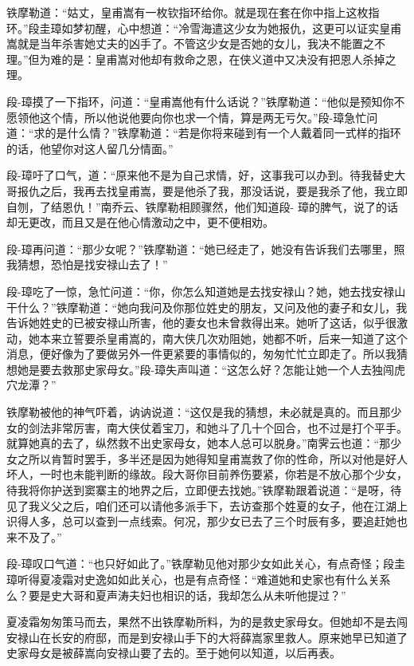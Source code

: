 \documentclass[12pt,oneside]{book}
\begin{document}
铁摩勒道：``姑丈，皇甫嵩有一枚钦指环给你。就是现在套在你中指上这枚指环。''段圭璋如梦初醒，心中想道：``冷雪海遣这少女为她报仇，这更可以证实皇甫嵩就是当年杀害她丈夫的凶手了。不管这少女是否她的女儿，我决不能置之不理。''但为难的是：皇甫嵩对他却有救命之恩，在侠义道中又决没有把恩人杀掉之理。

段-璋摸了一下指环，问道：``皇甫嵩他有什么话说？''铁摩勒道：``他似是预知你不愿领他这个情，所以他说他要向你也求一个情，算是两无亏欠。''段-璋急忙问道：``求的是什么情？''铁摩勒道：``若是你将来碰到有一个人戴着同一式样的指环的话，他望你对这人留几分情面。''

段-璋吁了口气，道：``原来他不是为自己求情，好，这事我可以办到。待我替史大哥报仇之后，我再去找皇甫嵩，要是他杀了我，那没话说，要是我杀了他，我立即自刎，了结恩仇！''南乔云、铁摩勒相顾骤然，他们知道段-
璋的脾气，说了的话却无更改，而且又是在他心情激动之中，更不便相劝。

段-璋再问道：``那少女呢？''铁摩勒道：``她已经走了，她没有告诉我们去哪里，照我猜想，恐怕是找安禄山去了！''

段-璋吃了一惊，急忙问道：``你，你怎么知道她是去找安禄山？她，她去找安禄山干什么？''铁摩勒道：``她向我问及你那位姓史的朋友，又问及他的妻子和女儿，我告诉她姓史的已被安禄山所害，他的妻女也未曾救得出来。她听了这话，似乎很激动，她本来立誓要杀皇甫嵩的，南大侠几次劝阻她，她都不听，后来一知道了这个消息，便好像为了要做另外一件更紧要的事情似的，匆匆忙忙立即走了。所以我猜想她是要去救那史家母女。''段-璋失声叫道：``这怎么好？怎能让她一个人去独闯虎穴龙潭？''

铁摩勒被他的神气吓着，讷讷说道：``这仅是我的猜想，未必就是真的。而且那少女的剑法非常厉害，南大侠仗着宝刀，和她斗了几十个回合，也不过是打个平手。就算她真的去了，纵然救不出史家母女，她本人总可以脱身。''南霁云也道：``那少女之所以肯暂时罢手，多半还是因为她得知皇甫嵩救了你的性命，所以对他是好人坏人，一时也未能判断的缘故。段大哥你目前养伤要紧，你若是不放心那个少女，待我将你护送到窦寨主的地界之后，立即便去找她。''铁摩勒跟着说道：``是呀，待见了我义父之后，咱们还可以请他多派手下，去访查那个姓夏的女子，他在江湖上识得人多，总可以查到一点线索。何况，那少女已去了三个时辰有多，要追赶她也来不及了。''

段-璋叹口气道：``也只好如此了。''铁摩勒见他对那少女如此关心，有点奇怪；段圭璋听得夏凌霜对史逸如如此关心，也是有点奇怪：``难道她和史家也有什么关系么？要是史大哥和夏声涛夫妇也相识的话，我却怎么从未听他提过？''

夏凌霜匆匆策马而去，果然不出铁摩勒所料，为的是救史家母女。但她却不是去闯安禄山在长安的府邸，而是到安禄山手下的大将薛嵩家里救人。原来她早已知道了史家母女是被薛嵩向安禄山要了去的。至于她何以知道，以后再表。
\end{document}

